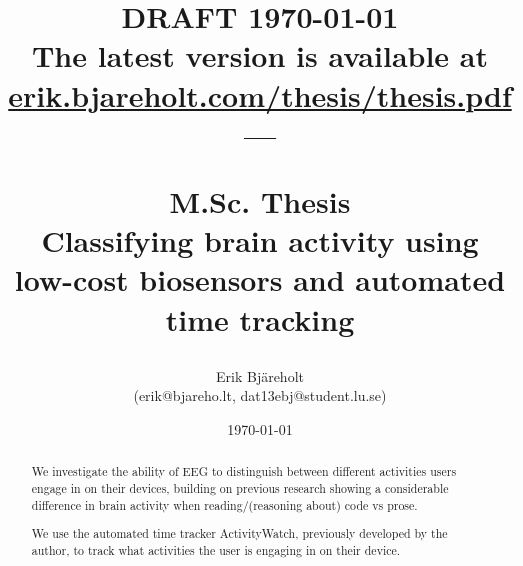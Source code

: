 \documentclass[a4paper]{article}
\title{%
    \small DRAFT \today \\
    \small The latest version is available at \href{https://erik.bjareholt.com/thesis/thesis.pdf}{erik.bjareholt.com/thesis/thesis.pdf}\\
    \large --- \\
    \large \par M.Sc. Thesis\\
    \huge Classifying brain activity using low-cost biosensors and automated time tracking \\
}
\author{Erik Bjäreholt \orcid{0000-0003-1350-9677} \\(erik@bjareho.lt, dat13ebj@student.lu.se)}
\date{\today}
\begin{document}
\maketitle

\begin{abstract}

    We investigate the ability of EEG to distinguish between different activities users engage in on their devices, building on previous research showing a considerable difference in brain activity when reading/(reasoning about) code vs prose.

    We use the automated time tracker ActivityWatch, previously developed by the author, to track what activities the user is engaging in on their device.
\end{abstract}

\pagebreak %

\tableofcontents


\pagebreak %
\end{document}
